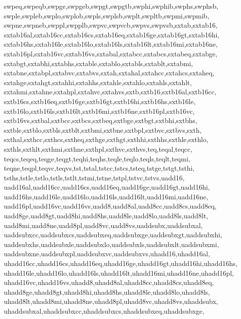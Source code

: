 {{      swpeq,swpeqb,swpge,swpgeb,swpgt,swpgtb,swphi,swphib,swphs,swphsb,       %
      swple,swpleb,swplo,swplob,swpls,swplsb,swplt,swpltb,swpmi,swpmib,       %
      swpne,swpneb,swppl,swpplb,swpvc,swpvcb,swpvs,swpvsb,sxtab,sxtab16,      %
      sxtab16al,sxtab16cc,sxtab16cs,sxtab16eq,sxtab16ge,sxtab16gt,sxtab16hi,  %
      sxtab16hs,sxtab16le,sxtab16lo,sxtab16ls,sxtab16lt,sxtab16mi,sxtab16ne,  %
      sxtab16pl,sxtab16vc,sxtab16vs,sxtabal,sxtabcc,sxtabcs,sxtabeq,sxtabge,  %
      sxtabgt,sxtabhi,sxtabhs,sxtable,sxtablo,sxtabls,sxtablt,sxtabmi,        %
      sxtabne,sxtabpl,sxtabvc,sxtabvs,sxtah,sxtahal,sxtahcc,sxtahcs,sxtaheq,  %
      sxtahge,sxtahgt,sxtahhi,sxtahhs,sxtahle,sxtahlo,sxtahls,sxtahlt,        %
      sxtahmi,sxtahne,sxtahpl,sxtahvc,sxtahvs,sxtb,sxtb16,sxtb16al,sxtb16cc,  %
      sxtb16cs,sxtb16eq,sxtb16ge,sxtb16gt,sxtb16hi,sxtb16hs,sxtb16le,         %
      sxtb16lo,sxtb16ls,sxtb16lt,sxtb16mi,sxtb16ne,sxtb16pl,sxtb16vc,         %
      sxtb16vs,sxtbal,sxtbcc,sxtbcs,sxtbeq,sxtbge,sxtbgt,sxtbhi,sxtbhs,       %
      sxtble,sxtblo,sxtbls,sxtblt,sxtbmi,sxtbne,sxtbpl,sxtbvc,sxtbvs,sxth,    %
      sxthal,sxthcc,sxthcs,sxtheq,sxthge,sxthgt,sxthhi,sxthhs,sxthle,sxthlo,  %
      sxthls,sxthlt,sxthmi,sxthne,sxthpl,sxthvc,sxthvs,teq,teqal,teqcc,       %
      teqcs,teqeq,teqge,teqgt,teqhi,teqhs,teqle,teqlo,teqls,teqlt,teqmi,      %
      teqne,teqpl,teqvc,teqvs,tst,tstal,tstcc,tstcs,tsteq,tstge,tstgt,tsthi,  %
      tsths,tstle,tstlo,tstls,tstlt,tstmi,tstne,tstpl,tstvc,tstvs,uadd16,     %
      uadd16al,uadd16cc,uadd16cs,uadd16eq,uadd16ge,uadd16gt,uadd16hi,         %
      uadd16hs,uadd16le,uadd16lo,uadd16ls,uadd16lt,uadd16mi,uadd16ne,         %
      uadd16pl,uadd16vc,uadd16vs,uadd8,uadd8al,uadd8cc,uadd8cs,uadd8eq,       %
      uadd8ge,uadd8gt,uadd8hi,uadd8hs,uadd8le,uadd8lo,uadd8ls,uadd8lt,        %
      uadd8mi,uadd8ne,uadd8pl,uadd8vc,uadd8vs,uaddsubx,uaddsubxal,            %
      uaddsubxcc,uaddsubxcs,uaddsubxeq,uaddsubxge,uaddsubxgt,uaddsubxhi,      %
      uaddsubxhs,uaddsubxle,uaddsubxlo,uaddsubxls,uaddsubxlt,uaddsubxmi,      %
      uaddsubxne,uaddsubxpl,uaddsubxvc,uaddsubxvs,uhadd16,uhadd16al,          %
      uhadd16cc,uhadd16cs,uhadd16eq,uhadd16ge,uhadd16gt,uhadd16hi,uhadd16hs,  %
      uhadd16le,uhadd16lo,uhadd16ls,uhadd16lt,uhadd16mi,uhadd16ne,uhadd16pl,  %
      uhadd16vc,uhadd16vs,uhadd8,uhadd8al,uhadd8cc,uhadd8cs,uhadd8eq,         %
      uhadd8ge,uhadd8gt,uhadd8hi,uhadd8hs,uhadd8le,uhadd8lo,uhadd8ls,         %
      uhadd8lt,uhadd8mi,uhadd8ne,uhadd8pl,uhadd8vc,uhadd8vs,uhaddsubx,        %
      uhaddsubxal,uhaddsubxcc,uhaddsubxcs,uhaddsubxeq,uhaddsubxge,            %
}}

